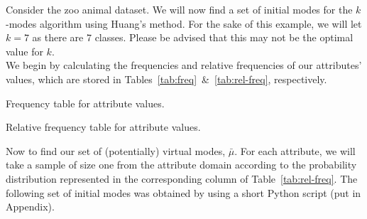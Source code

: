 \begin{example}\label{ex:huang}
    Consider the zoo animal dataset. We will now find a set of initial modes for
    the \(k\)-modes algorithm using Huang's method. For the sake of this
    example, we will let \(k = 7\) as there are \(7\) classes. Please be advised
    that this may not be the optimal value for \(k\).\\
    
    We begin by calculating the frequencies and relative frequencies of our 
    attributes' values, which are stored in 
    Tables~\ref{tab:freq}~\&~\ref{tab:rel-freq}, respectively.\\

    \begin{table}[h]
    \resizebox{\textwidth}{!}{%
        
    }
    \caption{Frequency table for attribute values.}\label{tab:freq}
    \end{table}

    \begin{table}[h]
    \resizebox{\textwidth}{!}{%
        
    }
    \caption{Relative frequency table for attribute values.}\label{tab:rel-freq}
    \end{table}

    Now to find our set of (potentially) virtual modes, \(\bar{\mu}\). For each
    attribute, we will take a sample of size one from the attribute domain
    according to the probability distribution represented in the corresponding
    column of Table~\ref{tab:rel-freq}. The following set of initial modes was 
    obtained by using a short Python script (put in Appendix).\\


\end{example}
